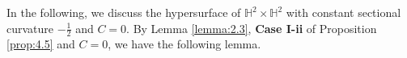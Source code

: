 \documentclass[reqno]{amsart}%
\theoremstyle{definition}
\newtheorem{remark}{Remark}[section]
\numberwithin{equation}{section}
\begin{document}






In the following, we discuss the hypersurface of $\mathbb{H}^2\times \mathbb{H}^2$ with constant sectional curvature $-\frac{1}{2}$ and $C=0$.
By Lemma \ref{lemma:2.3}, {\bf Case I-ii} of Proposition \ref{prop:4.5} and $C=0$, we have the following lemma.
\end{document}
